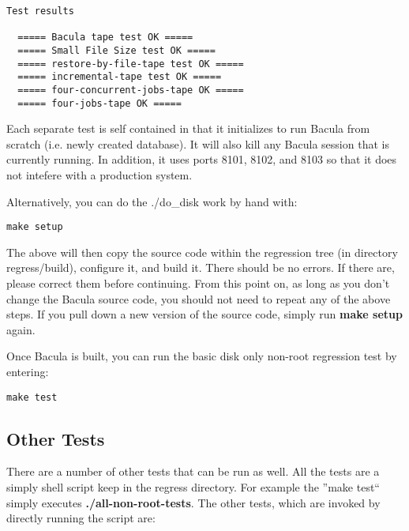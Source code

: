 \footnotesize
\begin{verbatim}
Test results

  ===== Bacula tape test OK =====
  ===== Small File Size test OK =====
  ===== restore-by-file-tape test OK =====
  ===== incremental-tape test OK =====
  ===== four-concurrent-jobs-tape OK =====
  ===== four-jobs-tape OK =====
\end{verbatim}
\normalsize

Each separate test is self contained in that it initializes to run Bacula from
scratch (i.e. newly created database). It will also kill any Bacula session
that is currently running. In addition, it uses ports 8101, 8102, and 8103 so
that it does not intefere with a production system.

Alternatively, you can do the ./do\_disk work by hand with:

\footnotesize
\begin{verbatim}
make setup
\end{verbatim}
\normalsize

The above will then copy the source code within
the regression tree (in directory regress/build), configure it, and build it.
There should be no errors. If there are, please correct them before
continuing. From this point on, as long as you don't change the Bacula
source code, you should not need to repeat any of the above steps.  If
you pull down a new version of the source code, simply run {\bf make setup}
again.


Once Bacula is built, you can run the basic disk only non-root regression test
by entering:

\footnotesize
\begin{verbatim}
make test
\end{verbatim}
\normalsize


\subsection{Other Tests}

There are a number of other tests that can be run as well. All the tests are a
simply shell script keep in the regress directory. For example the ''make
test`` simply executes {\bf ./all-non-root-tests}. The other tests, which
are invoked by directly running the script are:

